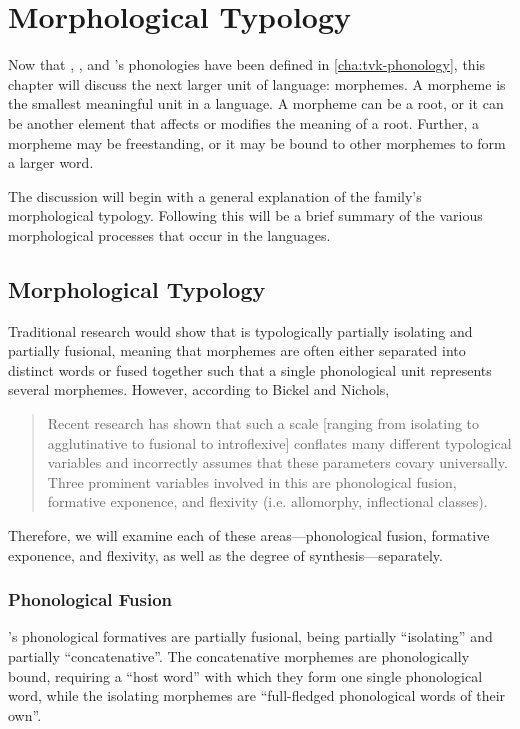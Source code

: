 \chapter{Morphological Typology}
\label{cha:tvk-morphological-typology}

Now that \langtvk, \langank, and \langrdk's phonologies have been defined in \autoref{cha:tvk-phonology}, this chapter will discuss the next larger unit of language: morphemes. A morpheme is the smallest meaningful unit in a language. A morpheme can be a root, or it can be another element that affects or modifies the meaning of a root. Further, a morpheme may be freestanding, or it may be bound to other morphemes to form a larger word.

The discussion will begin with a general explanation of the \langtvk{} family's morphological typology. Following this will be a brief summary of the various morphological processes that occur in the languages.

\section{Morphological Typology}
\label{sec:tvk-typology}

Traditional research would show that \langtvk{} is typologically partially isolating and partially fusional, meaning that morphemes are often either separated into distinct words or fused together such that a single phonological unit represents several morphemes. However, according to Bickel and Nichols, \blockquote{Recent research has shown that such a scale [ranging from isolating to agglutinative to fusional to introflexive] conflates many different typological variables and incorrectly assumes that these parameters covary universally\autocite{Plank-1999,Bickel-and-Nichols-2005}. Three prominent variables involved in this are phonological fusion, formative exponence, and flexivity (i.e. allomorphy, inflectional classes).\autocite{wals-20}} Therefore, we will examine each of these areas---phonological fusion, formative exponence, and flexivity, as well as the degree of synthesis---separately.

\subsection{Phonological Fusion}
\label{sec:tvk-fusion}

\langtvk's phonological formatives are partially fusional, being partially \enquote{isolating} and partially \enquote{concatenative}\autocite{wals-20}. The concatenative morphemes are phonologically bound, requiring a \enquote{host word} with which they form one single phonological word, while the isolating morphemes are \enquote{full-fledged phonological words of their own}.

